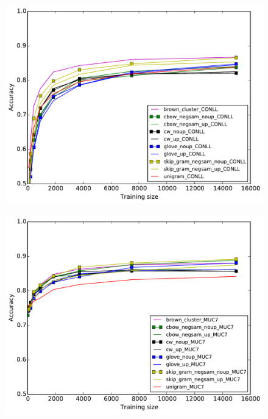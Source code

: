 \begin{figure}
\begin{minipage}[b]{7cm}
  \end{minipage} 
  \begin{minipage}[b]{7cm}
    	\includegraphics[scale=0.4]{plots/NER-OOV-IN}
    \label{NER-OOV-IN}
  \end{minipage}
  \hfill
  \begin{minipage}[b]{7cm}
    	\includegraphics[scale=0.4]{plots/NER-OOV-OUT}
    \label{NER-OOV-OUT}
  \end{minipage} 
  \begin{minipage}[b]{7cm}

\end{minipage}
\end{figure}
